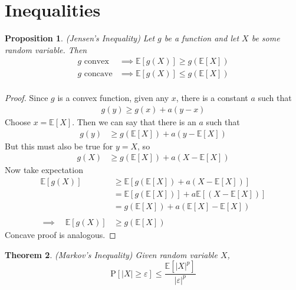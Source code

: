 \documentclass[12pt]{article}
\theoremstyle{plain}
\newtheorem{thm}{Theorem}[section]
\newtheorem{prop}[thm]{Proposition}
\theoremstyle{definition}
\theoremstyle{remark}
\newcommand{\Prb}{\mathrm{P}}
\newcommand{\E}{\mathbb{E}}
\begin{document}
\clearpage
\section{Inequalities}

\begin{prop}{\emph{(Jensen's Inequality)}}
Let $g$ be a function and let $X$ be some random variable. Then
\begin{align*}
  \text{$g$ convex} &\implies \E[g(X)] \geq g\left(\E[X]\right) \\
  \text{$g$ concave} &\implies \E[g(X)] \leq g\left(\E[X]\right) \\
\end{align*}
\end{prop}
\begin{proof}
Since $g$ is a convex function, given any $x$, there is a constant $a$
such that
\begin{align*}
  g(y) \geq g(x) + a (y-x)
\end{align*}
Choose $x=\E[X]$. Then we can say that there is an $a$ such that
\begin{align*}
  g(y) &\geq g(\E[X]) + a (y-\E[X])
\end{align*}
But this must also be true for $y=X$, so
\begin{align*}
  g(X) &\geq g(\E[X]) + a (X-\E[X])
\end{align*}
Now take expectation
\begin{align*}
  \E[g(X)]
  &\geq \E[g(\E[X]) + a (X-\E[X])] \\
  &= \E[g(\E[X])] + a \E[(X-\E[X])] \\
  &= g(\E[X]) + a (\E[X]-\E[X]) \\\\
  \implies \quad
  \E[g(X)] &\geq g(\E[X])
\end{align*}
Concave proof is analogous.
\end{proof}

\begin{thm}{\emph{(Markov's Inequality)}}
\label{thm:markov}
Given random variable $X$,
\begin{equation}
    \label{markov}
    \Prb\left[
      \left\lvert X\right\rvert
      \geq \varepsilon\right]
    \leq \frac{\E\left[|X|^p\right]}{|\varepsilon|^p}
\end{equation}
\end{thm}
\end{document}
